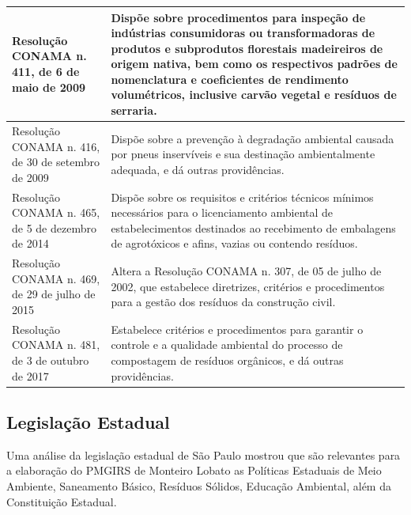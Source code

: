\begin{center}
\begin{longtable}{|p{}|p{}|}
			\hline
			Resolução   CONAMA   n.   411, de 6 de maio de 2009 & Dispõe  sobre  procedimentos  para  inspeção  de  indústrias  consumidoras  ou transformadoras  de produtos e subprodutos  florestais  madeireiros  de origem nativa, bem como os respectivos padrões de nomenclatura e coeficientes de rendimento volumétricos, inclusive carvão vegetal e resíduos de serraria. \\
			\hline
			Resolução   CONAMA   n.   416, de 30 de setembro de 2009 & Dispõe  sobre  a  prevenção  à  degradação  ambiental  causada  por  pneus inservíveis   e   sua   destinação   ambientalmente   adequada,   e   dá   outras providências. \\
			\hline
			Resolução   CONAMA   n.   465, de 5 de dezembro de 2014 & Dispõe  sobre  os  requisitos  e  critérios  técnicos  mínimos  necessários  para  o licenciamento  ambiental  de  estabelecimentos  destinados  ao  recebimento  de embalagens de agrotóxicos e afins, vazias ou contendo resíduos. \\
			\hline
			Resolução   CONAMA   n.   469, de 29 de julho de 2015 & Altera a Resolução CONAMA n. 307, de 05 de julho de 2002, que estabelece diretrizes, critérios e procedimentos para a gestão dos resíduos da construção civil. \\
			\hline
			Resolução   CONAMA   n.   481, de 3 de outubro de 2017 & Estabelece  critérios  e  procedimentos  para  garantir  o  controle  e  a  qualidade ambiental do processo de compostagem  de resíduos  orgânicos, e dá outras providências. \\
			\hline
			
		\end{longtable}
	\end{center}
	\renewcommand\LTcaptype{table}

	\subsection{Legislação Estadual}
	
	Uma análise da legislação estadual de São Paulo mostrou que são relevantes para a elaboração do PMGIRS de Monteiro Lobato as Políticas Estaduais de Meio Ambiente, Saneamento Básico, Resíduos Sólidos, Educação Ambiental, além da Constituição Estadual. 
	
